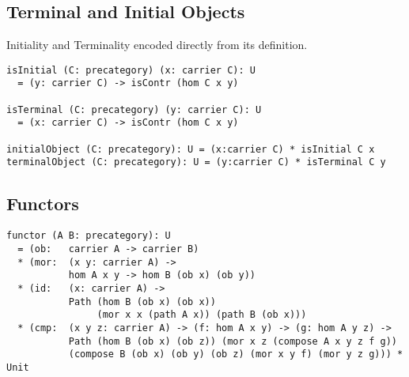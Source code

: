 \documentclass{article}
\begin{document}
\subsection{Terminal and Initial Objects}

Initiality and Terminality encoded directly from its definition.

\begin{lstlisting}[mathescape=true]
isInitial (C: precategory) (x: carrier C): U
  = (y: carrier C) -> isContr (hom C x y)

isTerminal (C: precategory) (y: carrier C): U
  = (x: carrier C) -> isContr (hom C x y)

initialObject (C: precategory): U = (x:carrier C) * isInitial C x
terminalObject (C: precategory): U = (y:carrier C) * isTerminal C y
\end{lstlisting}

\subsection{Functors}

\begin{lstlisting}[mathescape=true]
functor (A B: precategory): U
  = (ob:   carrier A -> carrier B)
  * (mor:  (x y: carrier A) ->
           hom A x y -> hom B (ob x) (ob y))
  * (id:   (x: carrier A) ->
           Path (hom B (ob x) (ob x))
                (mor x x (path A x)) (path B (ob x)))
  * (cmp:  (x y z: carrier A) -> (f: hom A x y) -> (g: hom A y z) ->
           Path (hom B (ob x) (ob z)) (mor x z (compose A x y z f g))
           (compose B (ob x) (ob y) (ob z) (mor x y f) (mor y z g))) * Unit
\end{lstlisting}



\end{document}
